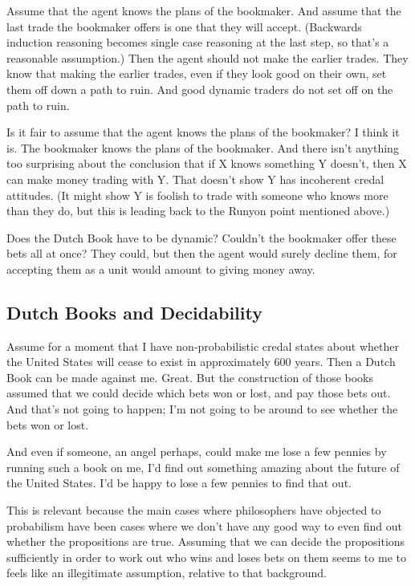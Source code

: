 Assume that the agent knows the plans of the bookmaker. And assume that the last trade the bookmaker offers is one that they will accept. (Backwards induction reasoning becomes single case reasoning at the last step, so that's a reasonable assumption.) Then the agent should not make the earlier trades. They know that making the earlier trades, even if they look good on their own, set them off down a path to ruin. And good dynamic traders do not set off on the path to ruin.

Is it fair to assume that the agent knows the plans of the bookmaker? I think it is. The bookmaker knows the plans of the bookmaker. And there isn't anything too surprising about the conclusion that if X knows something Y doesn't, then X can make money trading with Y. That doesn't show Y has incoherent credal attitudes. (It might show Y is foolish to trade with someone who knows more than they do, but this is leading back to the Runyon point mentioned above.)

Does the Dutch Book have to be dynamic? Couldn't the bookmaker offer these bets all at once? They could, but then the agent would surely decline them, for accepting them as a unit would amount to giving money away.

\subsection{Dutch Books and Decidability}
Assume for a moment that I have non-probabilistic credal states about whether the United States will cease to exist in approximately 600 years. Then a Dutch Book can be made against me. Great. But the construction of those books assumed that we could decide which bets won or lost, and pay those bets out. And that's not going to happen; I'm not going to be around to see whether the bets won or lost. 

And even if someone, an angel perhaps, could make me lose a few pennies by running such a book on me, I'd find out something amazing about the future of the United States. I'd be happy to lose a few pennies to find that out.

This is relevant because the main cases where philosophers have objected to probabilism have been cases where we don't have any good way to even find out whether the propositions are true. Assuming that we can decide the propositions sufficiently in order to work out who wins and loses bets on them seems to me to feels like an illegitimate assumption, relative to that background.

